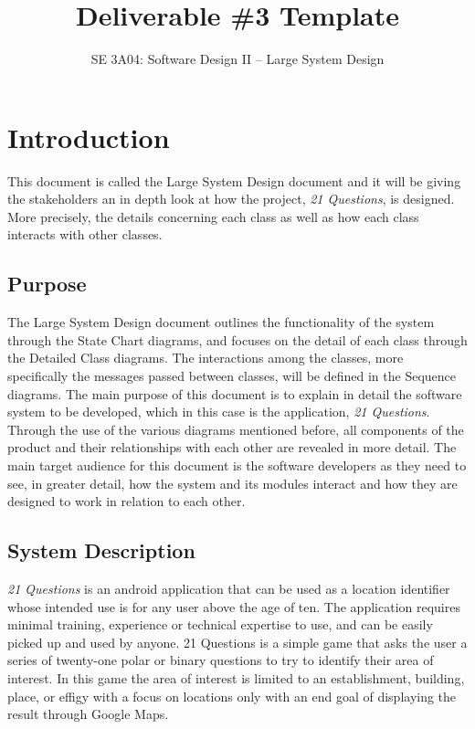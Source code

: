\documentclass[]{article}
\title{Deliverable \#3 Template}
\author{SE 3A04: Software Design II -- Large System Design}
\date{}
\begin{document}
\maketitle	

\section{Introduction}
\label{sec:introduction}

This document is called the Large System Design document and it will be giving the stakeholders an in depth look at how the project, \textit{21 Questions}, is designed. More precisely, the details concerning each class as well as how each class interacts with other classes. 

\subsection{Purpose}
\label{sub:purpose}


The Large System Design document outlines the functionality of the system through the State Chart diagrams, and focuses on the detail of each class through the Detailed Class diagrams. The interactions among the classes, more specifically the messages passed between classes, will be defined in the Sequence diagrams.  The main purpose of this document is to explain in detail the software system to be developed, which in this case is the application, \textit{21 Questions}. Through the use of the various diagrams mentioned before, all components of the product and their relationships with each other are revealed in more detail. The main target audience for this document is the software developers as they need to see, in greater detail, how the system and its modules interact and how they are designed to work in relation to each other.


\subsection{System Description}
\label{sub:system_description}


\textit{21 Questions} is an android application that can be used as a location identifier whose intended use is for any user above the age of ten. The application requires minimal training, experience or technical expertise to use, and can be easily picked up and used by anyone. 21 Questions is a simple game that asks the user a series of twenty-one polar or binary questions to try to identify their area of interest. In this game the area of interest is limited to an establishment, building, place, or effigy with a focus on locations only with an end goal of displaying the result through Google Maps.
\end{document}
